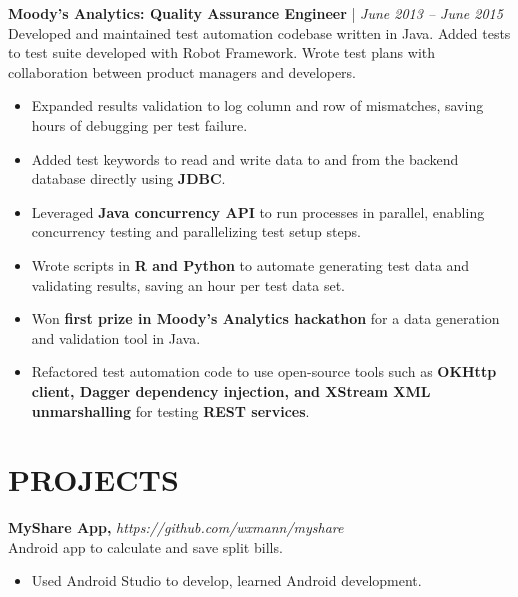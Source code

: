 \documentclass[9pt]{article}
\newcommand{\jobPosition}[1]{\vspace{2pt} #1}
\newcommand{\jobSummary}[1]{\vspace{2pt} \\ #1}
\newenvironment{jobHighlights}
	{\vspace{2pt}\begin{itemize}[noitemsep,nolistsep]}{\end{itemize} \vspace{6pt}}
\begin{document}
\jobPosition{\textbf{Moody's Analytics: Quality Assurance Engineer} | \textit{June 2013 -- June 2015}}
\jobSummary{Developed and maintained test automation codebase written in Java. Added tests to test suite developed with Robot Framework. Wrote test plans with collaboration between product managers and developers.}
\begin{jobHighlights}
	\item Expanded results validation to log column and row of mismatches, saving hours of debugging per test failure.
	\item Added test keywords to read and write data to and from the backend database directly using \textbf{JDBC}.
	\item Leveraged \textbf{Java concurrency API} to run processes in parallel, enabling concurrency testing and parallelizing test setup steps.
	\item Wrote scripts in \textbf{R and Python} to automate generating test data and validating results, saving an hour per test data set.
	\item Won \textbf{first prize in Moody's Analytics hackathon} for a data generation and validation tool in Java.
	\item Refactored test automation code to use open-source tools such as \textbf{OKHttp client, Dagger dependency injection, and XStream XML unmarshalling} for testing \textbf{REST services}.
\end{jobHighlights}



\section*{PROJECTS}

\jobPosition{\textbf{MyShare App,} \textit{https://github.com/wxmann/myshare}}
\jobSummary{Android app to calculate and save split bills.}
\begin{jobHighlights}
	\item Used Android Studio to develop, learned Android development.
\end{jobHighlights}
\end{document}
